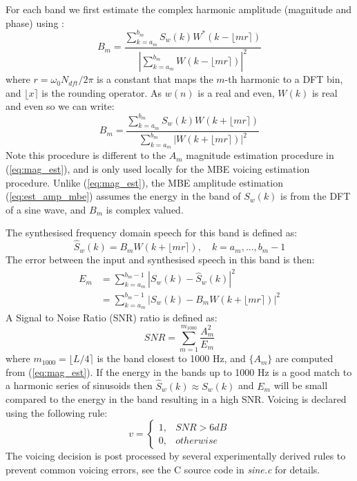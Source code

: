 \documentclass{article}
\begin{document}
For each band we first estimate the complex harmonic amplitude (magnitude and phase) using \cite{griffin1988multiband}:
\begin{equation}
B_m = \frac{\sum_{k=a_m}^{b_m} S_w(k) W^* (k - \lfloor mr \rceil)}{|\sum_{k=a_m}^{b_m} W (k - \lfloor mr \rceil)|^2}
\end{equation}
where $r= \omega_0 N_{dft}/2 \pi$ is a constant that maps the $m$-th harmonic to a DFT bin, and $ \lfloor x \rceil$ is the rounding operator.  As $w(n)$ is a real and even, $W(k)$ is real and even so we can write:
\begin{equation}
\label{eq:est_amp_mbe}
B_m = \frac{\sum_{k=a_m}^{b_m} S_w(k) W (k + \lfloor mr \rceil)}{\sum_{k=a_m}^{b_m} |W (k + \lfloor mr \rceil)|^2}
\end{equation}
Note this procedure is different to the $A_m$ magnitude estimation procedure in (\ref{eq:mag_est}), and is only used locally for the MBE voicing estimation procedure.  Unlike (\ref{eq:mag_est}), the MBE amplitude estimation (\ref{eq:est_amp_mbe}) assumes the energy in the band of $S_w(k)$ is from the DFT of a sine wave, and $B_m$ is complex valued.

The synthesised frequency domain speech for this band is defined as:
\begin{equation}
\hat{S}_w(k) = B_m W(k + \lfloor mr \rceil), \quad k=a_m,...,b_m-1
\end{equation}
The error between the input and synthesised speech in this band is then:
\begin{equation}
\begin{split}
E_m &= \sum_{k=a_m}^{b_m-1} |S_w(k) - \hat{S}_w(k)|^2 \\
    &=\sum_{k=a_m}^{b_m-1} |S_w(k) - B_m W(k + \lfloor mr \rceil)|^2
\end{split}
\end{equation}
A Signal to Noise Ratio (SNR) ratio is defined as:
\begin{equation}
\label{eq:voicing_snr}
SNR = \sum_{m=1}^{m_{1000}} \frac{A^2_m}{E_m}
\end{equation}
where $m_{1000}= \lfloor L/4 \rceil$ is the band closest to 1000 Hz, and $\{A_m\}$ are computed from (\ref{eq:mag_est}). If the energy in the bands up to 1000 Hz is a good match to a harmonic series of sinusoids then $\hat{S}_w(k) \approx S_w(k)$ and $E_m$ will be small compared to the energy in the band resulting in a high SNR.  Voicing is declared using the following rule:
\begin{equation}
v = \begin{cases}
    1, & SNR > 6 \si{dB} \\
    0, & otherwise
    \end{cases}
\end{equation}
The voicing decision is post processed by several experimentally derived rules to prevent common voicing errors, see the C source code in \emph{sine.c} for details.
\end{document}
